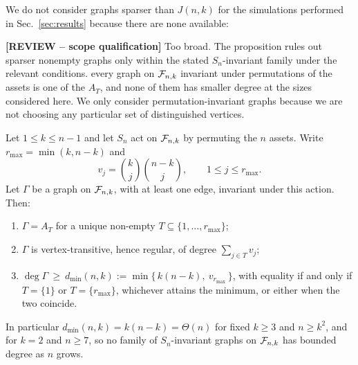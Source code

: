We do not consider graphs sparser than $J(n,k)$ for the simulations performed in Sec.~\ref{sec:results} because there are none
available:

{\color{red}\textbf{[REVIEW -- scope qualification]} Too broad. The proposition rules out sparser nonempty graphs only within the stated $S_n$-invariant family under the relevant conditions.} every graph on $\mathcal{F}_{n,k}$ invariant under permutations of the
assets is one of the $A_T$, and none of them has smaller degree at the
sizes considered here. We only consider permutation-invariant graphs because we are not choosing any particular set of distinguished vertices.

\begin{proposition}
\label{prop:min-degree}
Let $1\le k\le n-1$ and let $S_n$ act on $\mathcal{F}_{n,k}$ by permuting the $n$
assets. Write $r_{\max}=\min(k,n-k)$ and
\begin{equation}
    v_j=\binom{k}{j}\binom{n-k}{j},\qquad 1\le j\le r_{\max}.
    \label{eq:valency}
\end{equation}
Let $\Gamma$ be a graph on $\mathcal{F}_{n,k}$, with at least one edge, invariant
under this action. Then:
\begin{enumerate}
\item[(i)] $\Gamma=A_T$ for a unique non-empty
      $T\subseteq\{1,\dots,r_{\max}\}$;
\item[(ii)] $\Gamma$ is vertex-transitive, hence regular, of degree
      $\sum_{j\in T}v_j$;
\item[(iii)] $\deg\Gamma\ \ge\ d_{\min}(n,k):=\min\bigl\{\,k(n-k),\
      v_{r_{\max}}\,\bigr\}$, with equality if and only if $T=\{1\}$ or
      $T=\{r_{\max}\}$, whichever attains the minimum, or either when the
      two coincide.
\end{enumerate}
In particular $d_{\min}(n,k)=k(n-k)=\Theta(n)$ for fixed $k\ge3$ and
$n\ge k^{2}$, and for $k=2$ and $n\ge7$, so no family of $S_n$-invariant
graphs on $\mathcal{F}_{n,k}$ has bounded degree as $n$ grows.
\end{proposition}

